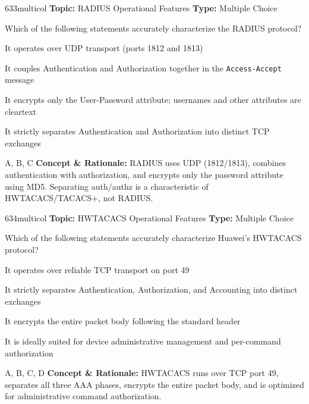 \begin{qcard}{633}{multicol}
\textcolor{darkslate!75}{\small\textbf{Topic:} RADIUS Operational Features \hfill \textbf{Type:} Multiple Choice}\vspace{0.4em}\par
Which of the following statements accurately characterize the RADIUS protocol?
\begin{qoptions}
\item It operates over UDP transport (ports 1812 and 1813)
\item It couples Authentication and Authorization together in the \texttt{Access-Accept} message
\item It encrypts only the User-Password attribute; usernames and other attributes are cleartext
\item It strictly separates Authentication and Authorization into distinct TCP exchanges
\end{qoptions}
\end{qcard}
\nopagebreak
\begin{explainbox}{A, B, C}
\textbf{Concept \& Rationale:} RADIUS uses UDP (1812/1813), combines authentication with authorization, and encrypts only the password attribute using MD5. Separating auth/authz is a characteristic of HWTACACS/TACACS+, not RADIUS.
\end{explainbox}

\begin{qcard}{634}{multicol}
\textcolor{darkslate!75}{\small\textbf{Topic:} HWTACACS Operational Features \hfill \textbf{Type:} Multiple Choice}\vspace{0.4em}\par
Which of the following statements accurately characterize Huawei's HWTACACS protocol?
\begin{qoptions}
\item It operates over reliable TCP transport on port 49
\item It strictly separates Authentication, Authorization, and Accounting into distinct exchanges
\item It encrypts the entire packet body following the standard header
\item It is ideally suited for device administrative management and per-command authorization
\end{qoptions}
\end{qcard}
\nopagebreak
\begin{explainbox}{A, B, C, D}
\textbf{Concept \& Rationale:} HWTACACS runs over TCP port 49, separates all three AAA phases, encrypts the entire packet body, and is optimized for administrative command authorization.
\end{explainbox}

